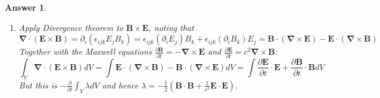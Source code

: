 \documentclass[a4paper]{article}
\newtheorem{ans}{Answer}[section]
\theoremstyle{new}
\begin{document}
\begin{ans}
\begin{enumerate}[label=(\alph*)]
\begin{enumerate}[label=(\roman*)]
\begin{align}
\end{align}
\item Apply Divergence theorem to $\mathbf{B}\times\mathbf{E}$, noting that
$$\boldsymbol{\nabla}\cdot(\mathbf{E}\times\mathbf{B})=\partial_i(\epsilon_{ijk}E_jB_k)=\epsilon_{ijk}(\partial_iE_j)B_k+\epsilon_{ijk}(\partial_iB_k)E_j=\mathbf{B}\cdot(\boldsymbol{\nabla}\times\mathbf{E})-\mathbf{E}\cdot(\boldsymbol{\nabla}\times\mathbf{B})$$
Together with the Maxwell equations $\frac{\partial\mathbf{B}}{\partial t}=-\boldsymbol{\nabla}\times\mathbf{E}$ and $\frac{\partial\mathbf{E}}{\partial t}=c^2\boldsymbol{\nabla}\times\mathbf{B}$:
$$\int_V\boldsymbol{\nabla}\cdot(\mathbf{E}\times\mathbf{B})dV=
\int\mathbf{E}\cdot(\boldsymbol{\nabla}\times\mathbf{B})-\mathbf{B}\cdot(\boldsymbol{\nabla}\times\mathbf{E})dV=\int\frac{\partial\mathbf{E}}{\partial t}\cdot\mathbf{E}+\frac{\partial\mathbf{B}}{\partial t}\cdot\mathbf{B}dV$$
But this is $-\frac{\partial}{\partial t}\int_V\lambda dV$ and hence $\lambda=-\frac{1}{2}(\mathbf{B}\cdot\mathbf{B}+\frac{1}{c^2}\mathbf{E}\cdot\mathbf{E})$.
\end{enumerate}
\end{enumerate}
\end{ans}
\end{document}

